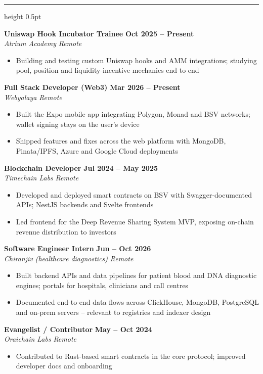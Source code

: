 \documentclass[11pt,a4paper]{article}
\newcommand{\cvsection}[1]{%
  \vspace{6pt}%
  \noindent{\large\textbf{\MakeUppercase{#1}}}%
  \vspace{2pt}%
  \hrule height 0.5pt%
  \vspace{4pt}%
}
\newcommand{\job}[4]{%
  \noindent \textbf{#1} \hfill \textbf{#2} \\
  \textit{#3} \hfill \textit{#4}%
}
\newenvironment{cvitems}{%
  \begin{itemize}[leftmargin=1.5em, itemsep=1pt, parsep=0pt, topsep=1.5pt]%
}{%
  \end{itemize}\vspace{2.5pt}%
}
\begin{document}
\newpage
\cvsection{Experience}

\job{Uniswap Hook Incubator Trainee}{Oct 2025 -- Present}{Atrium Academy}{Remote}
\begin{cvitems}
  \item Building and testing custom Uniswap hooks and AMM integrations; studying pool, position and liquidity-incentive mechanics end to end
\end{cvitems}

\job{Full Stack Developer (Web3)}{Mar 2026 -- Present}{Webyalaya}{Remote}
\begin{cvitems}
  \item Built the Expo mobile app integrating Polygon, Monad and BSV networks; wallet signing stays on the user's device
  \item Shipped features and fixes across the web platform with MongoDB, Pinata/IPFS, Azure and Google Cloud deployments
\end{cvitems}

\job{Blockchain Developer}{Jul 2024 -- May 2025}{Timechain Labs}{Remote}
\begin{cvitems}
  \item Developed and deployed smart contracts on BSV with Swagger-documented APIs; NestJS backends and Svelte frontends
  \item Led frontend for the Deep Revenue Sharing System MVP, exposing on-chain revenue distribution to investors
\end{cvitems}

\job{Software Engineer Intern}{Jun -- Oct 2026}{Chiranjiv (healthcare diagnostics)}{Remote}
\begin{cvitems}
  \item Built backend APIs and data pipelines for patient blood and DNA diagnostic engines; portals for hospitals, clinicians and call centres
  \item Documented end-to-end data flows across ClickHouse, MongoDB, PostgreSQL and on-prem servers -- relevant to registries and indexer design
\end{cvitems}

\job{Evangelist / Contributor}{May -- Oct 2024}{Oraichain Labs}{Remote}
\begin{cvitems}
  \item Contributed to Rust-based smart contracts in the core protocol; improved developer docs and onboarding
\end{cvitems}
\end{document}

